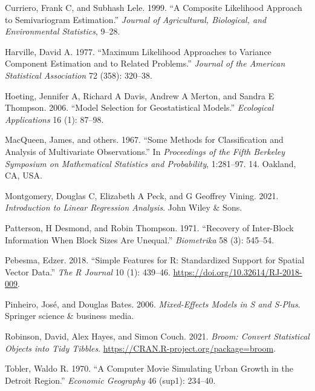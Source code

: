 \documentclass{article}
\begin{document}
\leavevmode\hypertarget{ref-curriero1999composite}{}%
Curriero, Frank C, and Subhash Lele. 1999. ``A Composite Likelihood
Approach to Semivariogram Estimation.'' \emph{Journal of Agricultural,
Biological, and Environmental Statistics}, 9--28.

\leavevmode\hypertarget{ref-harville1977maximum}{}%
Harville, David A. 1977. ``Maximum Likelihood Approaches to Variance
Component Estimation and to Related Problems.'' \emph{Journal of the
American Statistical Association} 72 (358): 320--38.

\leavevmode\hypertarget{ref-hoeting2006model}{}%
Hoeting, Jennifer A, Richard A Davis, Andrew A Merton, and Sandra E
Thompson. 2006. ``Model Selection for Geostatistical Models.''
\emph{Ecological Applications} 16 (1): 87--98.

\leavevmode\hypertarget{ref-macqueen1967some}{}%
MacQueen, James, and others. 1967. ``Some Methods for Classification and
Analysis of Multivariate Observations.'' In \emph{Proceedings of the
Fifth Berkeley Symposium on Mathematical Statistics and Probability},
1:281--97. 14. Oakland, CA, USA.

\leavevmode\hypertarget{ref-montgomery2021introduction}{}%
Montgomery, Douglas C, Elizabeth A Peck, and G Geoffrey Vining. 2021.
\emph{Introduction to Linear Regression Analysis}. John Wiley \& Sons.

\leavevmode\hypertarget{ref-patterson1971recovery}{}%
Patterson, H Desmond, and Robin Thompson. 1971. ``Recovery of
Inter-Block Information When Block Sizes Are Unequal.''
\emph{Biometrika} 58 (3): 545--54.

\leavevmode\hypertarget{ref-pebesma2018sf}{}%
Pebesma, Edzer. 2018. ``Simple Features for R: Standardized Support for
Spatial Vector Data.'' \emph{The R Journal} 10 (1): 439--46.
\url{https://doi.org/10.32614/RJ-2018-009}.

\leavevmode\hypertarget{ref-pinheiro2006mixed}{}%
Pinheiro, José, and Douglas Bates. 2006. \emph{Mixed-Effects Models in S
and S-Plus}. Springer science \& business media.

\leavevmode\hypertarget{ref-robinson2021broom}{}%
Robinson, David, Alex Hayes, and Simon Couch. 2021. \emph{Broom: Convert
Statistical Objects into Tidy Tibbles}.
\url{https://CRAN.R-project.org/package=broom}.

\leavevmode\hypertarget{ref-tobler1970computer}{}%
Tobler, Waldo R. 1970. ``A Computer Movie Simulating Urban Growth in the
Detroit Region.'' \emph{Economic Geography} 46 (sup1): 234--40.
\end{document}
